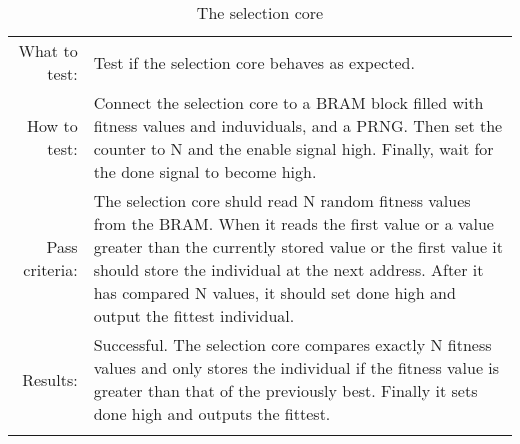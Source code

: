 \begin{table}[H]
  \begin{tabular}{r | p{9cm}}
    \noalign{\smallskip}\hline\noalign{\smallskip}
    
    What to test:  &  Test if the selection core behaves as expected. \\

    \noalign{\smallskip}\hline\noalign{\smallskip}

    How to test:   &  Connect the selection core to a BRAM block filled with 
                      fitness values and induviduals, and a PRNG. Then set the
                      counter to N and the enable signal high. Finally, wait for
                      the done signal to become high.
                      \\
                      
    \noalign{\smallskip}\hline\noalign{\smallskip}
                      
    Pass criteria:  & The selection core shuld read N random fitness values from the BRAM.
                      When it reads the first value or a value greater than the currently
                      stored value or the first value it should store the individual
                      at the next address. After it has compared N values, it should set
                      done high and output the fittest individual.
                      \\
                      
    \noalign{\smallskip}\hline\noalign{\smallskip}
                      
    Results: &        Successful.
                      The selection core compares exactly N fitness values and only
                      stores the individual if the fitness value is greater than that
                      of the previously best. Finally it sets done high and outputs
                      the fittest.
                      \\
                      
   \noalign{\smallskip}\hline\noalign{\smallskip}
  
  
  \end{tabular}
  \caption{The selection core}
  \label{testing:components:genetic_pipeline:selection_core}
\end{table}
